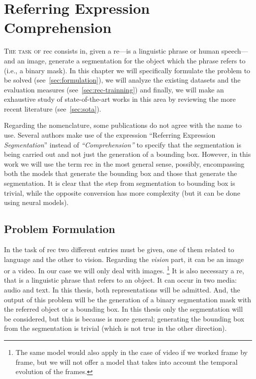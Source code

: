 

\chapter{Referring Expression Comprehension}%
\label{cha:rec}



\lettrine{T}{he task of} \gls{rec} consists in, given a \gls{re}---is a
linguistic phrase or human speech---and an image, generate a segmentation for
the object which the phrase refers to (i.e., a binary mask). In this chapter we
will specifically formulate the problem to be solved (see\
\vref{sec:formulation}), we will analyze the existing datasets and the
evaluation measures (see\ \vref{sec:rec-trainning}) and finally, we will make
an exhaustive study of state-of-the-art works in this area by reviewing the
more recent literature (see\ \vref{sec:sota}).

Regarding the nomenclature, some publications do not agree with the name to
use. Several authors make use of the expression ``Referring Expression
\textit{Segmentation}'' instead of \textit{``Comprehension''} to specify that
the segmentation is being carried out and not just the generation of a bounding
box. However, in this work we will use the term \gls{rec} in the most general
sense, possibly, encompassing both the models that generate the bounding box
and those that generate the segmentation. It is clear that the step from
segmentation to bounding box is trivial, while the opposite conversion has more
complexity (but it can be done using neural models).



\section{Problem Formulation}\label{sec:formulation}

In the task of \gls{rec} two different entries must be given, one of them
related to language and the other to vision. Regarding the \emph{vision} part,
it can be an image or a video. In our case we will only deal with images.%
\footnote{The same model would also apply in the case of video if we worked
  frame by frame, but we will not offer a model that takes into account the
  temporal evolution of the frames.} It is also necessary a
\gls{re}, that is a linguistic phrase that refers
to an object. It can occur in two media: audio and text. In this thesis, both
representations will be admitted. And, the output of this problem will be the
generation of a binary segmentation mask with the referred object or a bounding
box\index{Bounding box}. In this thesis only the segmentation will be
considered, but this is because is more general; generating the bounding box
from the segmentation is trivial (which is not true in the other direction).

